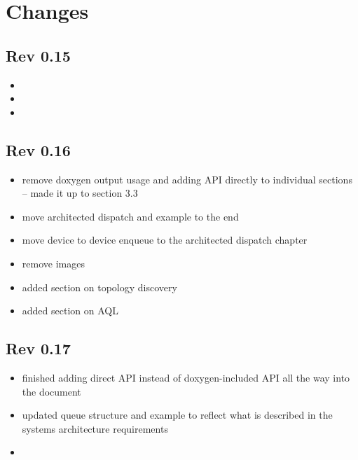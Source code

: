 \section{Changes}
\subsection{Rev 0.15}
\begin{itemize}
\item {}
\item {}
\item {}
\end{itemize}

\subsection{Rev 0.16}
\begin{itemize}
\item remove doxygen output usage and adding API directly to individual sections -- made it up to section 3.3
\item move architected dispatch and example to the end
\item move device to device enqueue to the architected dispatch chapter
\item remove images
\item added section on topology discovery
\item added section on AQL
\end{itemize}

\subsection{Rev 0.17}
\begin{itemize}
\item finished adding direct API instead of doxygen-included API all
the way into the document
\item updated queue structure and example to reflect what is
described in the systems architecture requirements
\item 
\end{itemize}

